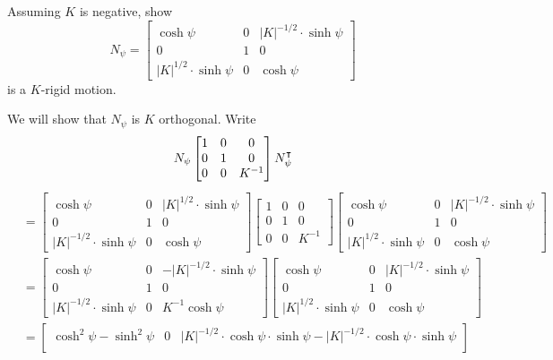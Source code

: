 \documentclass[handout,newpage,hints,,12pt,noauthor,nooutcomes]{ximera}
\begin{document}
\begin{problem}
  Assuming $K$ is negative, show
  \[
   N_\psi=
  \begin{bmatrix}
    \cosh\psi & 0 & |K|^{-1/2}\cdot\sinh\psi\\
    0 & 1 & 0\\
    |K|^{1/2}\cdot\sinh\psi & 0 & \cosh\psi
  \end{bmatrix}
  \]
  is a $K$-rigid motion.
  \begin{freeResponse}
    We will show that $N_\psi$ is $K$ orthogonal. Write
    \[
    N_\psi
      \begin{bmatrix}
        1 & 0 & 0 \\
        0 & 1 & 0 \\
        0 & 0 & K^{-1}
      \end{bmatrix}
      N_\psi^\intercal
    \]
    \begin{align*}
  &=
      \begin{bmatrix}
    \cosh\psi & 0 & |K|^{1/2}\cdot\sinh\psi\\
    0 & 1 & 0\\
    |K|^{-1/2}\cdot\sinh\psi & 0 & \cosh\psi
      \end{bmatrix}
      \begin{bmatrix}
        1 & 0 & 0 \\
        0 & 1 & 0 \\
        0 & 0 & K^{-1}
      \end{bmatrix}
 \begin{bmatrix}
    \cosh\psi & 0 & |K|^{-1/2}\cdot\sinh\psi\\
    0 & 1 & 0\\
    |K|^{1/2}\cdot\sinh\psi & 0 & \cosh\psi
 \end{bmatrix} \\
&=\begin{bmatrix}
    \cosh\psi & 0 & -|K|^{-1/2}\cdot\sinh\psi\\
    0 & 1 & 0\\
    |K|^{-1/2}\cdot\sinh\psi & 0 &  K^{-1}\cosh\psi
      \end{bmatrix}
 \begin{bmatrix}
    \cosh\psi & 0 & |K|^{-1/2}\cdot\sinh\psi\\
    0 & 1 & 0\\
    |K|^{1/2}\cdot\sinh\psi & 0 & \cosh\psi
 \end{bmatrix}\\
&=\begin{bmatrix}
    \cosh^2\psi -\sinh^2\psi & 0 & |K|^{-1/2}\cdot\cosh\psi\cdot\sinh\psi- |K|^{-1/2}\cdot\cosh\psi\cdot\sinh\psi\\

\end{bmatrix}
\end{align*}
\end{freeResponse}
\end{problem}
\end{document}
